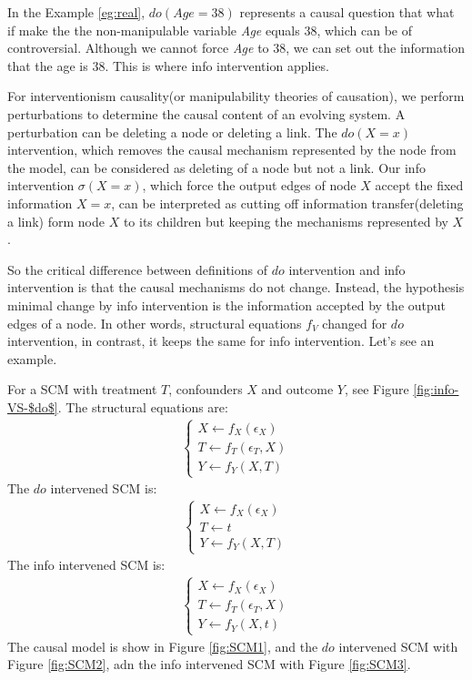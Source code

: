 In the Example \ref{eg:real}, $do(Age = 38)$ represents a causal question that what if make the the non-manipulable variable \emph{Age} equals 38, which can be of controversial. Although we cannot force \emph{Age} to 38, we can set out the information that the age is 38. This is where info intervention applies. 


For interventionism causality(or manipulability theories of causation), {{we perform perturbations to determine the causal content\cite{zenil2019causal} of an evolving system}}. A  perturbation can be deleting a node or deleting a link. The $do(X=x)$ intervention, which removes the causal mechanism represented by the node  from the model, can be considered as deleting of a node but not a link. Our info intervention $\sigma(X=x)$, which force the output edges of node $X$ accept the fixed information $X=x$,  can be interpreted as cutting off information transfer(deleting a link) form node $X$ to its children but keeping the mechanisms represented by $X$.

So the critical difference between definitions of $do$ intervention and info intervention is that the causal mechanisms do not change. Instead, the hypothesis minimal change by info intervention is the information accepted by the output edges of a node. In other words, structural equations $f_V$ changed for $do$ intervention, in contrast, it keeps the same for info intervention. Let's see an example.



\begin{Eg}
	\label{eg1}
	For a SCM with treatment $T$, confounders $X$ and outcome $Y$, see Figure \ref{fig:info-VS-$do$}.  The structural equations are:
	$$
	\begin{aligned}
	\begin{cases}
	X \leftarrow f_X(\epsilon_X)  \\
	T \leftarrow f_T(\epsilon_T, X) \\
	Y \leftarrow f_Y(X, T)
	\end{cases}
	\end{aligned}
	$$    
	The $do$ intervened SCM is: 
	$$
	\begin{aligned}
	\begin{cases}
	X \leftarrow f_X(\epsilon_X)  \\
	T \leftarrow t \\
	Y \leftarrow f_Y(X, T)
	\end{cases}
	\end{aligned}
	$$    	
	The info intervened SCM is: 
	$$
	\begin{aligned}
	\begin{cases}
	X \leftarrow f_X(\epsilon_X)  \\
	T \leftarrow f_T(\epsilon_T, X) \\
	Y \leftarrow f_Y(X, t) 
	\end{cases}
	\end{aligned}
	$$ 
	 The causal model is show in Figure \ref{fig:SCM1}, and the $do$ intervened SCM with Figure  \ref{fig:SCM2}, adn the info intervened SCM with Figure \ref{fig:SCM3}. 
	
\end{Eg}

